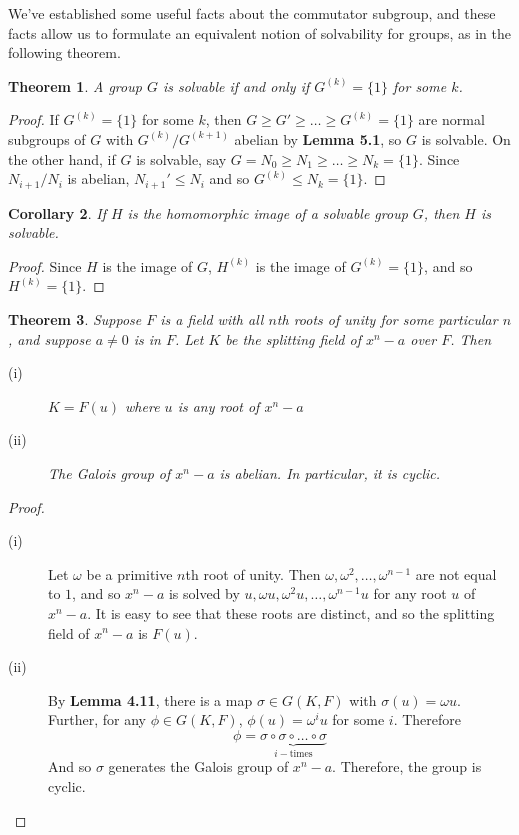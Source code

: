 \documentclass[12pt,leqno]{article}
\numberwithin{equation}{section}
\theoremstyle{plain}
\newtheorem{thm}{Theorem}[section]
\newtheorem{cor}[thm]{Corollary}
\theoremstyle{definition}
\theoremstyle{remark}
\begin{document}
We've established some useful facts about the commutator subgroup, and these facts allow us to formulate an equivalent notion of solvability for groups, as in the following theorem.

\begin{thm}
 A group $G$ is solvable if and only if $G^{(k)}=\{1\}$ for some $k$.
\end{thm}

\begin{proof}
 If $G^{(k)}=\{1\}$ for some $k$, then $G\geq G'\geq\hdots\geq G^{(k)}=\{1\}$ are normal subgroups of $G$ with $G^{(k)}/G^{(k+1)}$ abelian by \textbf{Lemma 5.1}, so $G$ is solvable. On the other hand, if $G$ is solvable, say $G=N_0\geq N_1\geq\hdots\geq N_k=\{1\}$. Since $N_{i+1}/N_i$ is abelian, $N_{i+1}'\leq N_i$ and so $G^{(k)}\leq N_k=\{1\}$.
\end{proof}

\begin{cor}
 If $H$ is the homomorphic image of a solvable group $G$, then $H$ is solvable.
\end{cor}

\begin{proof}
 Since $H$ is the image of $G$, $H^{(k)}$ is the image of $G^{(k)}=\{1\}$, and so $H^{(k)}=\{1\}$.
\end{proof}

\begin{thm}
 Suppose $F$ is a field with all $n$th roots of unity for some particular $n$, and suppose $a\not=0$ is in $F$. Let $K$ be the splitting field of $x^n-a$ over $F$. Then
\begin{description}
 \item [(i)] $K=F(u)$ where $u$ is any root of $x^n-a$
 \item [(ii)] The Galois group of $x^n-a$ is abelian. In particular, it is cyclic.
\end{description}
\end{thm}

\begin{proof}
 \begin{description}
  \item [(i)]  Let $\omega$ be a primitive $n$th root of unity. Then $\omega,\omega^2,\hdots,\omega^{n-1}$ are not equal to $1$, and so $x^n-a$ is solved by $u,\omega u,\omega^2u,\hdots,\omega^{n-1}u$ for any root $u$ of $x^n-a$. It is easy to see that these roots are distinct, and so the splitting field of $x^n-a$ is $F(u)$. 
  \item [(ii)]  By \textbf{Lemma 4.11}, there is a map $\sigma\in G(K,F)$ with $\sigma(u)=\omega u$. Further, for any $\phi\in G(K,F)$, $\phi(u)=\omega^iu$ for some $i$. Therefore \[\phi=\underbrace{\sigma\circ\sigma\circ\hdots\circ\sigma}_{i-\text{times}}\] And so $\sigma$ generates the Galois group of $x^n-a$. Therefore, the group is cyclic.\qedhere
 \end{description}
\end{proof}
\end{document}

